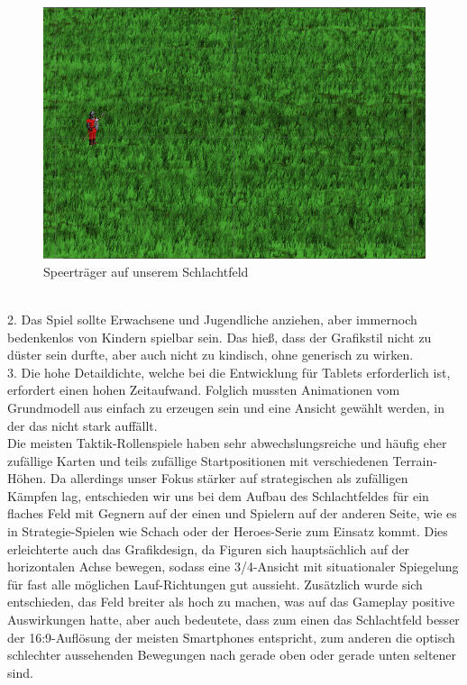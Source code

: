 \documentclass[extern,palatino]{cgBA}
\begin{document}
\begin{figure}
	\centering
	\includegraphics[width=13cm]{soldierbackground.png}
	\caption{Speerträger auf unserem Schlachtfeld}
	\label{speerkarte}
\end{figure}
\\2. Das Spiel sollte Erwachsene und Jugendliche anziehen, aber immernoch bedenkenlos von Kindern spielbar sein. Das hieß, dass der Grafikstil nicht zu düster sein durfte, aber auch nicht zu kindisch, ohne generisch zu wirken.
\\3. Die hohe Detaildichte, welche bei die Entwicklung für Tablets erforderlich ist, erfordert einen hohen Zeitaufwand. Folglich mussten Animationen vom Grundmodell aus einfach zu erzeugen sein und eine Ansicht gewählt werden, in der das nicht stark auffällt.
\\Die meisten Taktik-Rollenspiele haben sehr abwechslungsreiche und häufig eher zufällige Karten und teils zufällige Startpositionen mit verschiedenen Terrain-Höhen. Da allerdings unser Fokus stärker auf strategischen als zufälligen Kämpfen lag, entschieden wir uns bei dem Aufbau des Schlachtfeldes für ein flaches Feld mit Gegnern auf der einen und Spielern auf der anderen Seite, wie es in Strategie-Spielen wie Schach oder der Heroes-Serie zum Einsatz kommt. Dies erleichterte auch das Grafikdesign, da Figuren sich hauptsächlich auf der horizontalen Achse bewegen, sodass eine 3/4-Ansicht mit situationaler Spiegelung für fast alle möglichen Lauf-Richtungen gut aussieht. Zusätzlich wurde sich entschieden, das Feld breiter als hoch zu machen, was auf das Gameplay positive Auswirkungen hatte, aber auch bedeutete, dass zum einen das Schlachtfeld besser der 16:9-Auflösung der meisten Smartphones entspricht, zum anderen die optisch schlechter aussehenden Bewegungen nach gerade oben oder gerade unten seltener sind.
\end{document}
